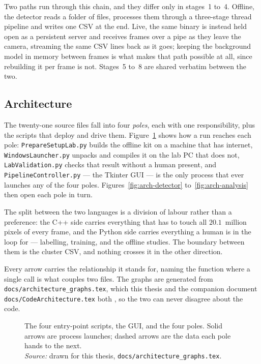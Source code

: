 \documentclass[a4paper,headsepline,oneside,11pt]{scrartcl}
\newcommand{\figsource}[1]{\\[3pt]{\footnotesize\emph{Source:} #1}}
\begin{document}
Two paths run through this chain, and they differ only in stages~1 to~4.
Offline, the detector reads a folder of files, processes them through a
three-stage thread pipeline and writes one CSV at the end. Live, the same binary
is instead held open as a persistent server and receives frames over a pipe as
they leave the camera, streaming the same CSV lines back as it goes; keeping the
background model in memory between frames is what makes that path possible at
all, since rebuilding it per frame is not. Stages~5 to~8 are shared verbatim
between the two.

\subsection{Architecture}
\label{sec:architecture}
The twenty-one source files fall into four \emph{poles}, each with one
responsibility, plus the scripts that deploy and drive them.
Figure~\ref{fig:arch-overview} shows how a run reaches each pole:
\texttt{PrepareSetupLab.py} builds the offline kit on a machine that has
internet, \texttt{WindowsLauncher.py} unpacks and compiles it on the lab PC
that does not, \texttt{LabValidation.py} checks that result without a human
present, and \texttt{PipelineController.py} --- the Tkinter GUI --- is the only
process that ever launches any of the four poles. Figures~\ref{fig:arch-detector}
to~\ref{fig:arch-analysis} then open each pole in turn.

The split between the two languages is a division of labour rather than a
preference: the C++ side carries everything that has to touch all $20.1$~million
pixels of every frame, and the Python side carries everything a human is in the
loop for --- labelling, training, and the offline studies. The boundary between
them is the cluster CSV, and nothing crosses it in the other direction.

Every arrow carries the relationship it stands for, naming the function where a
single call is what couples two files. The graphs are generated from
\texttt{docs/architecture\_graphs.tex}, which this thesis and the companion
document \texttt{docs/CodeArchitecture.tex} both \verb||, so the two can
never disagree about the code.

\begin{figure}[htbp]
  \centering
  \resizebox{\textwidth}{!}{\qbArchOverview}
  \caption{The four entry-point scripts, the GUI, and the four poles.
  Solid arrows are process launches; dashed arrows are the data each pole
  hands to the next.\figsource{drawn for this thesis, \texttt{docs/architecture\_graphs.tex}.}}
  \label{fig:arch-overview}
\end{figure}
\end{document}
